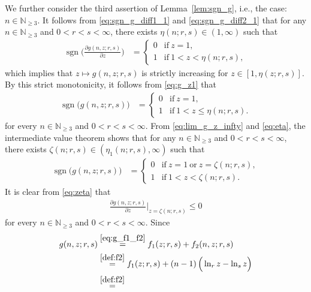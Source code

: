 \documentclass[conference, draftcls, onecolumn]{IEEEtran}
\theoremstyle{plain}
\newcommand{\sgn}{\operatorname{sgn}}
\newcommand{\lemref}[1]{Lemma~\ref{#1}}
\begin{document}
\begin{IEEEproof}[Proof of \lemref{lem:sgn_g}]
We further consider the third assertion of \lemref{lem:sgn_g}, i.e., the case: $n \in \mathbb{N}_{\ge 3}$.
It follows from \eqref{eq:sgn_g_diff1_1} and \eqref{eq:sgn_g_diff2_1} that for any $n \in \mathbb{N}_{\ge 3}$ and $0 < r < s < \infty$, there exists $\eta(n; r, s) \in (1, \infty)$ such that
\begin{align}
\sgn\bigg( \frac{ \partial g(n, z; r, s) }{ \partial z } \bigg)
& =
\begin{cases}
0
& \mathrm{if} \ z = 1 ,
\\
1
& \mathrm{if} \ 1 < z < \eta(n; r, s) ,
\end{cases}
\label{eq:eta1}
\end{align}
which implies that $z \mapsto g(n, z; r, s)$ is strictly increasing for $z \in [1, \eta(z; r, s)]$.
By this strict monotonicity, it follows from \eqref{eq:g_z1} that
\begin{align}
\sgn\Big( g(n, z; r, s) \Big)
& =
\begin{cases}
0
& \mathrm{if} \ z = 1 ,
\\
1
& \mathrm{if} \ 1 < z \le \eta(n; r, s) .
\end{cases}
\label{eq:eta}
\end{align}
for every $n \in \mathbb{N}_{\ge 3}$ and $0 < r < s < \infty$.
From \eqref{eq:lim_g_z_infty} and \eqref{eq:eta}, the intermediate value theorem shows that for any $n \in \mathbb{N}_{\ge 3}$ and $0 < r < s < \infty$, there exists $\zeta(n; r, s) \in (\eta_{1}(n; r, s), \infty)$ such that 
\begin{align}
\sgn\Big( g(n, z; r, s) \Big)
& =
\begin{cases}
0
& \mathrm{if} \ z = 1 \ \mathrm{or} \ z = \zeta(n; r, s) ,
\\
1
& \mathrm{if} \ 1 < z < \zeta(n; r, s) .
\end{cases}
\label{eq:zeta}
\end{align}
It is clear from \eqref{eq:zeta} that
\begin{align}
\frac{ \partial g(n, z; r, s) }{ \partial z } \bigg|_{z = \zeta(n; r, s)}
\le
0
\label{eq:diff1_g_at_zeta}
\end{align}
for every $n \in \mathbb{N}_{\ge 3}$ and $0 < r < s < \infty$.
Since
\begin{align}
g(n, z; r, s)
& \overset{\eqref{eq:g_f1_f2}}{=}
f_{1}(z; r, s) + f_{2}(n, z; r, s)
\\
& \overset{\eqref{def:f2}}{=}
f_{1}(z; r, s) + (n-1) \, \Big( \ln_{r} z - \ln_{s} z \Big)
\\
& \overset{\eqref{def:f2}}{=}

\end{align}
\end{IEEEproof}
\end{document}
